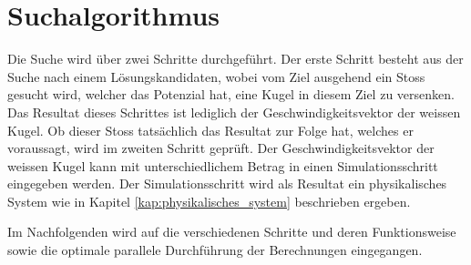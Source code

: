 \newpage
\section{Suchalgorithmus}\label{kap:algorithmus_suche}
Die Suche wird über zwei Schritte durchgeführt. Der erste Schritt besteht aus der Suche nach einem Lösungskandidaten,
wobei vom Ziel ausgehend ein Stoss gesucht wird, welcher das Potenzial hat, eine Kugel in diesem Ziel zu versenken. Das Resultat
dieses Schrittes ist lediglich der Geschwindigkeitsvektor der weissen Kugel.
Ob dieser Stoss tatsächlich das Resultat zur Folge hat, welches er voraussagt, wird im zweiten Schritt geprüft. Der
Geschwindigkeitsvektor der weissen Kugel kann mit unterschiedlichem Betrag in einen Simulationsschritt eingegeben werden.
Der Simulationsschritt wird als Resultat ein physikalisches System wie in Kapitel \ref{kap:physikalisches_system}
beschrieben ergeben.

Im Nachfolgenden wird auf die verschiedenen Schritte und deren Funktionsweise sowie die optimale parallele Durchführung
der Berechnungen eingegangen.





\newpage

\newpage

\newpage
